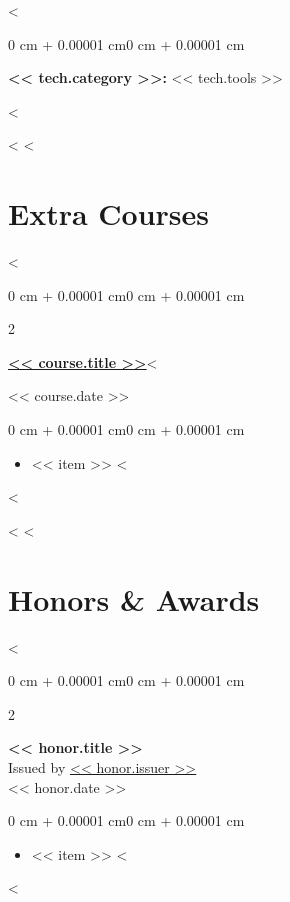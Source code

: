 \documentclass[10pt, letterpaper]{article}
\newenvironment{highlights}{
    \begin{itemize}[
        topsep=0.10 cm,
        parsep=0.10 cm,
        partopsep=0pt,
        itemsep=2pt,
        leftmargin=0 cm + 10pt
    ]
}{
    \end{itemize}
}
\newenvironment{onecolentry}{
    \begin{adjustwidth}{0 cm + 0.00001 cm}{0 cm + 0.00001 cm}
}{
    \end{adjustwidth}
}
\newenvironment{twocolentry}[2][]{
    \onecolentry
    \def\secondColumn{#2}
    \setcolumnwidth{\fill, 4.5 cm}
    \begin{paracol}{2}
}{
    \switchcolumn \raggedleft \secondColumn
    \end{paracol}
    \endonecolentry
}
\begin{document}
<%
    \begin{onecolentry}
        \textbf{<< tech.category >>:} << tech.tools >>
    \end{onecolentry}
<%

    \vspace{0.12cm}

<%
<%


    \section{Extra Courses}

<%
    \begin{twocolentry}{<< course.date >>}
        \textbf{\href{<< course.title_url >>}{<< course.title >>}}<%
    \end{twocolentry}

    \vspace{0.10 cm}
    \begin{onecolentry}
        \begin{highlights}
<%
            \item << item >>
<%
        \end{highlights}
    \end{onecolentry}
<%

    \vspace{0.2cm}

<%
<%


    \section{Honors \& Awards}

<%
    \begin{twocolentry}{<< honor.date >>}
        \textbf{<< honor.title >>} \\
        Issued by \href{<< honor.issuer_url >>}{<< honor.issuer >>} \\
    \end{twocolentry}

    \vspace{0.10 cm}
    \begin{onecolentry}
        \begin{highlights}
<%
            \item << item >>
<%
        \end{highlights}
    \end{onecolentry}
<%
\end{document}
